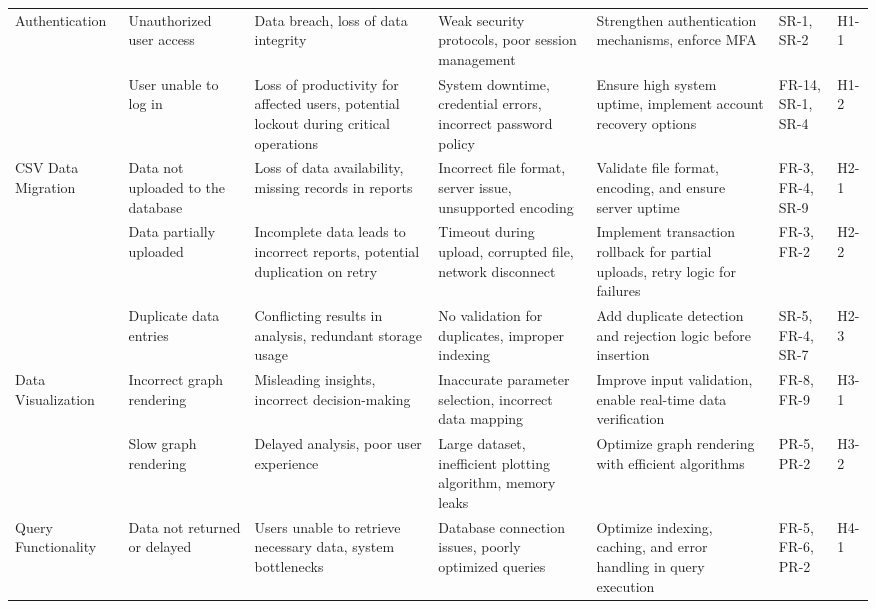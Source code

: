 \documentclass{article}
\begin{document}
\begin{landscape}
\begin{longtable}{|p{2.5cm}|p{4cm}|p{4cm}|p{4cm}|p{4cm}|p{1.25cm}|p{1cm}|}
      \hline
      \endfoot
      Authentication & Unauthorized user access & Data breach, loss of data
      integrity & Weak security protocols, poor session management & Strengthen
      authentication mechanisms, enforce MFA & SR-1, SR-2 & H1-1 \\
      \cline{2-7}
      \texttt{} & User unable to log in & Loss of productivity for affected
      users, potential lockout during critical operations & System downtime,
      credential errors, incorrect password policy & Ensure high system uptime,
      implement account recovery options & FR-14, SR-1, SR-4 & H1-2 \\
      \cline{1-7}
      CSV Data Migration & Data not uploaded to the database & Loss of data
      availability, missing records in reports & Incorrect file format, server
      issue, unsupported encoding & Validate file format, encoding, and ensure
      server uptime & FR-3, FR-4, SR-9 & H2-1 \\
      \cline{2-7}
      \texttt{} & Data partially uploaded & Incomplete data leads to incorrect
      reports, potential duplication on retry & Timeout during upload, corrupted
      file, network disconnect & Implement transaction rollback for partial
      uploads, retry logic for failures & FR-3, FR-2 & H2-2 \\
      \cline{2-7}
      \texttt{} & Duplicate data entries & Conflicting results in analysis,
      redundant storage usage & No validation for duplicates, improper indexing
      & Add duplicate detection and rejection logic before insertion & SR-5,
      FR-4, SR-7 & H2-3 \\
      \cline{1-7}
      Data Visualization & Incorrect graph rendering & Misleading insights,
      incorrect decision-making & Inaccurate parameter selection, incorrect data
      mapping & Improve input validation, enable real-time data verification &
      FR-8, FR-9 & H3-1 \\
      \cline{2-7}
      \texttt{} & Slow graph rendering & Delayed analysis, poor user experience
      & Large dataset, inefficient plotting algorithm, memory leaks & Optimize
      graph rendering with efficient algorithms & PR-5, PR-2 & H3-2 \\
      \cline{1-7}
      Query Functionality & Data not returned or delayed & Users unable to
      retrieve necessary data, system bottlenecks & Database connection issues,
      poorly optimized queries & Optimize indexing, caching, and error handling
      in query execution & FR-5, FR-6, PR-2 & H4-1 \\

\end{longtable}
\end{landscape}
\end{document}
